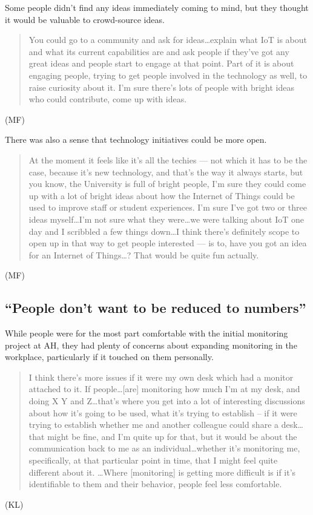 Some people didn’t find any ideas immediately coming to mind, but they
thought it would be valuable to crowd-source ideas.

\begin{quote}You could go to a community and ask for ideas\ldots explain what IoT is
about and what its current capabilities are and ask people if they’ve
got any great ideas and people start to engage at that point. Part of
it is about engaging people, trying to get people involved in the
technology as well, to raise curiosity about it. I’m sure there’s lots
of people with bright ideas who could contribute, come up with ideas.
\end{quote}
(MF) 

There was also a sense that technology initiatives could be more open.

\begin{quote}At the moment it feels like it’s all the techies --- not which it has
to be the case, because it’s new technology, and that’s the way it
always starts, but you know, the University is full of bright people,
I’m sure they could come up with a lot of bright ideas about how the
Internet of Things could be used to improve staff or student
experiences. I’m sure I’ve got two or three ideas myself\ldots I’m not sure what
they were\ldots we were talking about IoT one day and I scribbled a few
things down\ldots I think there’s definitely scope to open up in that way to
get people interested --– is to, have you got an idea for an Internet of
Things\ldots ? That would be quite fun actually.
\end{quote}
(MF) 

\subsection{``People don’t want to be reduced to numbers”}
\label{sec:people-dont-want}


While people were for the most part comfortable with the initial
monitoring project at AH, they had plenty of concerns about expanding
monitoring in the workplace, particularly if it touched on them
personally.

\begin{quote}I think there’s more issues if it were my own desk which had a
monitor attached to it. If people\ldots [are] monitoring how much I’m at my
desk, and doing X Y and Z\ldots that’s where you get into a lot of
interesting discussions about how it’s going to be used, what it’s
trying to establish – if it were trying to establish whether me and
another colleague could share a desk\ldots that might be fine, and I’m quite
up for that, but it would be about the communication back to me as an
individual\ldots whether it’s monitoring me, specifically, at that
particular point in time, that I might feel quite different about it.
\ldots Where [monitoring] is getting more difficult is if it’s
identifiable to them and their behavior, people feel less
comfortable.
\end{quote}
(KL)

